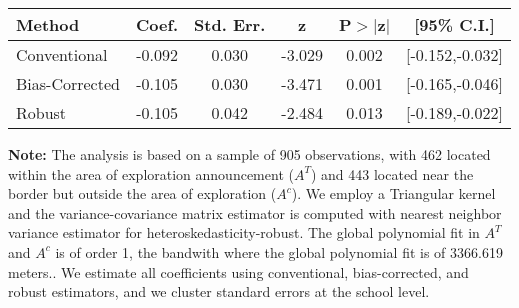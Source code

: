 \begin{table}[htbp]\centering
 \footnotesize 
\begin{tabular}{lccccc}
\hline\hline
Method & Coef. & Std. Err. & z & P$>|$z$|$ & [95\% C.I.] \\ 
\hline \hline  
Conventional & -0.092 & 0.030 & -3.029 & 0.002 & [-0.152,-0.032] \\ 
 Bias-Corrected & -0.105 & 0.030 & -3.471 & 0.001 & [-0.165,-0.046] \\ 
Robust & -0.105 & 0.042 & -2.484 & 0.013 & [-0.189,-0.022] \\ 
  \hline\hline
\end{tabular}
\label{table:rd}
\begin{tablenotes} 
  \justifying \tiny \textbf{Note: }    
   The analysis is based on a sample of 905 observations, with 462 located within the area of exploration announcement ($A^{T}$) and 443 located near the border but outside the area of exploration  ($A^{c}$). 
           We employ a Triangular kernel and the variance-covariance matrix estimator is computed with nearest neighbor variance estimator for heteroskedasticity-robust. The global polynomial fit in  $A^{T}$ and $A^{c}$ is of order 1, the bandwith where the global polynomial fit is of 3366.619 meters.. We estimate all coefficients using conventional, bias-corrected, and robust estimators, and we cluster standard errors at the school level. \end{tablenotes} 
 \end{table} 
